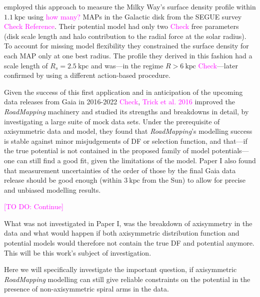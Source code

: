 \documentclass[iop,revtex4,numberedappendix,appendixfloats]{emulateapj}
\newcommand{\RM}{{\sl RoadMapping}}
\newcommand{\Wilma}[1]{\textcolor{Magenta}{#1}}
\begin{document}
\citet{2013ApJ...779..115B} employed this approach to measure the Milky Way's surface density profile within $1.1~\text{kpc}$ using \Wilma{how many?} MAPs in the Galactic disk from the SEGUE survey \Wilma{Check} \Wilma{Reference}. Their potential model had only two \Wilma{Check} free parameters (disk scale length and halo contribution to the radial force at the solar radius). To account for missing model flexibility they constrained the surface density for each MAP only at one best radius. The profile they derived in this fashion had a scale length of $R_s=2.5~\text{kpc}$ and was---in the regime $R>6~\text{kpc}$ \Wilma{Check}---later confirmed by \citet{2014MNRAS.445.3133P} using a different action-based procedure.

Given the success of this first application and in anticipation of the upcoming data releases from Gaia in 2016-2022 \Wilma{Check}, \Wilma{Trick et al. 2016} improved the \RM{} machinery and studied its strengths and breakdowns in detail, by investigating a large suite of mock data sets. Under the prerequisite of axisymmetric data and model, they found that \RM{}'s modelling success is stable against minor misjudgements of DF or selection function, and that---if the true potential is not contained in the proposed family of model potentials---one can still find a good fit, given the limitations of the model. Paper I also found that measurement uncertainties of the order of those by the final Gaia data release should be good enough (within $3~\text{kpc}$ from the Sun) to allow for precise and unbiased modelling results. 

\Wilma{[TO DO: Continue]}

What was not investigated in Paper I, was the breakdown of axisymmetry in the data and what would happen if both axisymmetric distribution function and potential models would therefore not contain the true DF and potential anymore. This will be this work's subject of investigation.

Here we will specifically investigate the important question, if axisymmetric \RM{} modelling can still give reliable constraints on the potential in the presence of non-axisymmetric spiral arms in the data.
\end{document}

